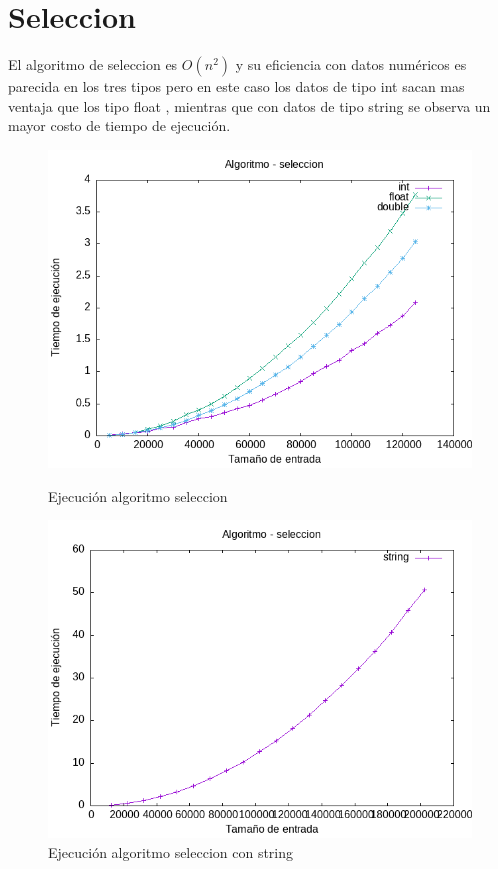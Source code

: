 \documentclass[11pt,openany]{book}
\begin{document}
\section*{Seleccion}
El algoritmo de seleccion es \(O(n^2)\) y su eficiencia con datos numéricos es parecida en los tres
tipos pero en este caso los datos de tipo int sacan mas ventaja que los tipo float , mientras que con datos de tipo string se observa un mayor costo de tiempo de ejecución.
\begin{figure}[H]
    \begin{minipage}{0.5\textwidth}
        \centering
        \includegraphics[width=\linewidth]{assets/Img/seleccion.png}
        \caption{Ejecución algoritmo seleccion}
        \label{fig:seleccion}
    \end{minipage}%
    \begin{minipage}{0.5\textwidth}
        \centering
        \includegraphics[width=\linewidth]{assets/Img/seleccionstring.png}
        \caption{Ejecución algoritmo seleccion con string}
        \label{fig:seleccionstring}
    \end{minipage}
\end{figure}
\end{document}

